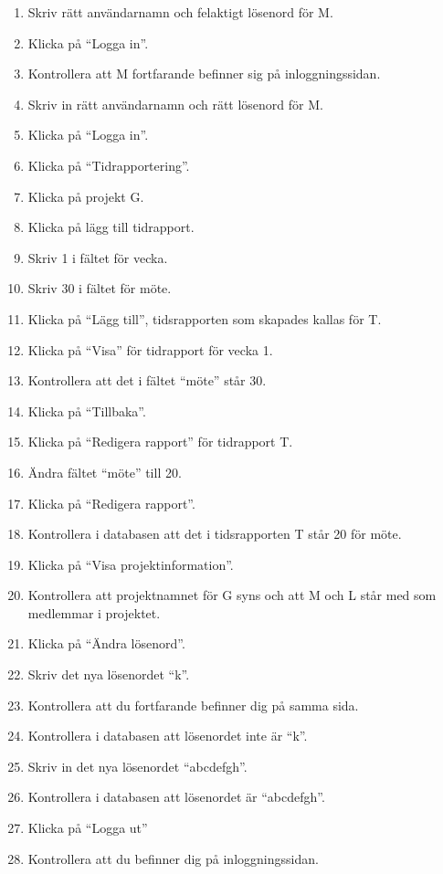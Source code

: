 \documentclass[a4paper]{article}
\begin{document}
\begin{ST}
\begin{enumerate}
\item Skriv rätt användarnamn och felaktigt lösenord för M.
\item Klicka på ``Logga in''.
\item Kontrollera att M fortfarande befinner sig på inloggningssidan.
\item Skriv in rätt användarnamn och rätt lösenord för M.
\item Klicka på ``Logga in''.
\item Klicka på ``Tidrapportering''.
\item Klicka på projekt G.
\item Klicka på lägg till tidrapport.
\item Skriv 1 i fältet för vecka.
\item Skriv 30 i fältet för möte.
\item Klicka på ``Lägg till'', tidsrapporten som skapades kallas för T.
\item Klicka på ``Visa'' för tidrapport för vecka 1.
\item Kontrollera att det i fältet ``möte'' står 30.
\item Klicka på ``Tillbaka''.
\item Klicka på ``Redigera rapport'' för tidrapport T.
\item Ändra fältet ``möte'' till 20.
\item Klicka på ``Redigera rapport''.
\item Kontrollera i databasen att det i tidsrapporten T står 20 för möte.
\item Klicka på ``Visa projektinformation''.
\item Kontrollera att projektnamnet för G syns och att M och L står med som medlemmar i projektet.
\item Klicka på ``Ändra lösenord''.
\item Skriv det nya lösenordet ``k''.
\item Kontrollera att du fortfarande befinner dig på samma sida.
\item Kontrollera i databasen att lösenordet inte är ``k''.
\item Skriv in det nya lösenordet ``abcdefgh''.
\item Kontrollera i databasen att lösenordet är ``abcdefgh''.
\item Klicka på ``Logga ut''
\item Kontrollera att du befinner dig på inloggningssidan.

\end{enumerate}

\end{ST}
\end{document}
